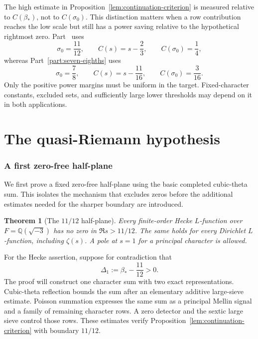 \documentclass[11pt,a4paper]{article}
\numberwithin{equation}{section}
\numberwithin{figure}{section}
\newtheorem{theorem}{Theorem}[section]
\theoremstyle{definition}
\theoremstyle{remark}
\begin{document}
The high estimate in Proposition~\ref{lem:continuation-criterion} is measured
relative to $C(\beta_*)$, not to $C(\sigma_0)$. This distinction matters when
a row contribution reaches the low scale but still has a power saving relative
to the hypothetical rightmost zero. Part~\ref{part:eleven-twelfths} uses
\[
 \sigma_0=\frac{11}{12},\qquad C(s)=s-\frac23,
 \qquad C(\sigma_0)=\frac14,
\]
whereas Part~\ref{part:seven-eighths} uses
\[
 \sigma_0=\frac78,\qquad C(s)=s-\frac{11}{16},
 \qquad C(\sigma_0)=\frac3{16}.
\]
Only the positive power margins must be uniform in the target. Fixed-character
constants, excluded sets, and sufficiently large lower thresholds may depend
on it in both applications.

\clearpage
\part{The quasi-Riemann hypothesis}
\label{part:eleven-twelfths}

\section{A first zero-free half-plane}
\label{sec:first-stage}

We first prove a fixed zero-free half-plane using the basic completed
cubic-theta sum. This isolates the mechanism that excludes zeros before the
additional estimates needed for the sharper boundary are introduced.

\begin{theorem}[The $11/12$ half-plane]
\label{thm:eleven-twelfths}
Every finite-order Hecke $L$-function over $F=\mathbb Q(\sqrt{-3})$ has no
zero in $\Re s>11/12$. The same holds for every Dirichlet $L$-function,
including $\zeta(s)$. A pole at $s=1$ for a principal character is allowed.
\end{theorem}

For the Hecke assertion, suppose for contradiction that
\begin{equation}
 \Delta_1:=\beta_*-\frac{11}{12}>0.
 \label{eq:first-stage-gap}
\end{equation}
The proof will construct one character sum with two exact representations.
Cubic-theta reflection bounds the sum after an elementary additive
large-sieve estimate. Poisson summation expresses the same sum as a principal
Mellin signal and a family of remaining character rows. A zero detector and
the sextic large sieve control those rows. These estimates verify
Proposition~\ref{lem:continuation-criterion} with boundary $11/12$.
\end{document}
